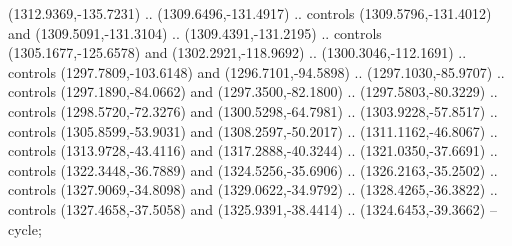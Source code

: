 \begin{scope}[shift={(-22.88722,-49.76189)}]
\begin{scope}[shift={(-739.46591,328.36782)}]
      (1312.9369,-135.7231) .. (1309.6496,-131.4917) .. controls
      (1309.5796,-131.4012) and (1309.5091,-131.3104) .. (1309.4391,-131.2195) ..
      controls (1305.1677,-125.6578) and (1302.2921,-118.9692) ..
      (1300.3046,-112.1691) .. controls (1297.7809,-103.6148) and
      (1296.7101,-94.5898) .. (1297.1030,-85.9707) .. controls (1297.1890,-84.0662)
      and (1297.3500,-82.1800) .. (1297.5803,-80.3229) .. controls
      (1298.5720,-72.3276) and (1300.5298,-64.7981) .. (1303.9228,-57.8517) ..
      controls (1305.8599,-53.9031) and (1308.2597,-50.2017) .. (1311.1162,-46.8067)
      .. controls (1313.9728,-43.4116) and (1317.2888,-40.3244) ..
      (1321.0350,-37.6691) .. controls (1322.3448,-36.7889) and (1324.5256,-35.6906)
      .. (1326.2163,-35.2502) .. controls (1327.9069,-34.8098) and
      (1329.0622,-34.9792) .. (1328.4265,-36.3822) .. controls (1327.4658,-37.5058)
      and (1325.9391,-38.4414) .. (1324.6453,-39.3662) -- cycle;


\end{scope}
\end{scope}
